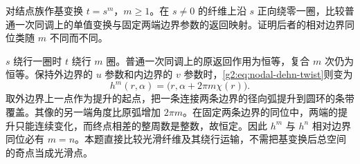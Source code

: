 \begin{exercise}\label{g2:ex:node-base-change}
	对结点族作基变换 \(t=s^m\)，\(m\geq1\)。在 \(s\ne0\) 的纤维上沿 \(s\) 正向绕零一圈，比较普通一次同调上的单值变换与固定两端边界参数的返回映射。证明后者的相对边界同位类随 \(m\) 不同而不同。
\end{exercise}
\begin{solution}
	\(s\) 绕行一圈时 \(t\) 绕行 \(m\) 圈。普通一次同调上的原返回作用为恒等，复合 \(m\) 次仍为恒等。保持外边界的 \(u\) 参数和内边界的 \(v\) 参数时，\cref{g2:eq:nodal-dehn-twist}则变为
	\[
		h^m(r,\alpha)=\bigl(r,\alpha+2\pi m\chi(r)\bigr).
	\]
	取外边界上一点作为提升的起点，把一条连接两条边界的径向弧提升到圆环的条带覆盖。其像的另一端角度比原弧增加 \(2\pi m\)。在固定两条边界的同位中，两端的提升只能连续变化，而终点相差的整周数是整数，故恒定。因此 \(h^m\) 与 \(h^n\) 相对边界同位必有 \(m=n\)。本题直接比较光滑纤维及其绕行运输，不需把基变换后总空间的奇点当成光滑点。
\end{solution}
